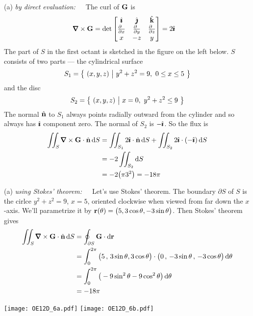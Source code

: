 \begin{solution}
(a) \emph{by direct evaluation:}\ \ \ 
The curl of $\mathbf{G}$ is
\begin{align*}
\vnabla\times\vG
&=\det\left[\begin{matrix}
\hi &\hj &\hk \\
\tfrac{\partial\hfill}{\partial x} & \tfrac{\partial\hfill}{\partial y} & 
                \tfrac{\partial\hfill}{\partial z} \\
x & -z & y
\end{matrix}
\right]
=2\hi
\end{align*}
The part of $S$ in the first octant is sketched in the figure on the left below.
$S$ consists of two parts --- the cylindrical surface
\begin{equation*}
S_1 = \big\{ \ (x,y,z)\ \big|\ y^2+z^2=9,\ 0\le x\le 5\ \big\}
\end{equation*}
and the disc
\begin{equation*}
S_2 = \big\{ \ (x,y,z)\ \big|\ x=0,\ y^2+z^2\le 9\ \big\}
\end{equation*}
The normal $\hat{\mathbf{n}}$ to $S_1$ always points radially outward from the cylinder
and so always has $\hat{\pmb{\imath}}$ component zero. The normal of $S_2$ is $-\hat{\pmb{\imath}}$.
So the flux is
\begin{align*}
\dblInt_S \vnabla\times \vG \cdot \hn\,\dee{S}
&= \dblInt_{S_1} 2\hi \cdot \hn\,\dee{S}
   + \dblInt_{S_2} 2\hi \cdot (-\hi)\,\dee{S} \\
&= -2 \dblInt_{S_2} \dee{S} \\
&= -2 \big(\pi 3^2\big) = -18\pi
\end{align*}



(a) \emph{using Stokes' theorem:}\ \ \ 
Let's use Stokes' theorem. The boundary $\partial S$ of $S$ is the cirlce 
$y^2+z^2=9$, $x=5$, oriented clockwise when viewed from far down the $x$-axis.
We'll parametrize it by $\mathbf{r}(\theta)=\big(5, 3\cos\theta, -3\sin\theta\big)$.
Then Stokes' theorem gives
\begin{align*}
\dblInt_S \vnabla\times\vG\cdot\hn\,\dee{S}
&=\oint_{\partial S}\vG\cdot\dee{\vr} \\
&=\int_0^{2\pi} \big(5\,,\,3\sin\theta,3\cos\theta\big)\cdot
       \big(0\,,\,-3\sin\theta\,,\,-3\cos\theta\big)\,\dee{\theta} \\
&=\int_0^{2\pi} \big(-9\sin^2\theta-9\cos^2\theta\big)\,\dee{\theta} \\
&=-18\pi
\end{align*} 

\begin{center}
       \texttt{[image: OE12D\_6a.pdf]} \qquad\qquad
       \texttt{[image: OE12D\_6b.pdf]}
\end{center}


\end{solution}
